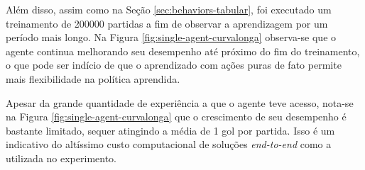 Além disso, assim como na Seção \ref{sec:behaviors-tabular}, foi executado um treinamento de 200000 partidas a fim de observar a aprendizagem por um período mais longo. Na Figura \ref{fig:single-agent-curvalonga} observa-se que o agente continua melhorando seu desempenho até próximo do fim do treinamento, o que pode ser indício de que o aprendizado com ações puras de fato permite mais flexibilidade na política aprendida.

Apesar da grande quantidade de experiência a que o agente teve acesso, nota-se na Figura \ref{fig:single-agent-curvalonga} que o crescimento de seu desempenho é bastante limitado, sequer atingindo a média de 1 gol por partida. Isso é um indicativo do altíssimo custo computacional de soluções \textit{end-to-end} como a utilizada no experimento.



 


